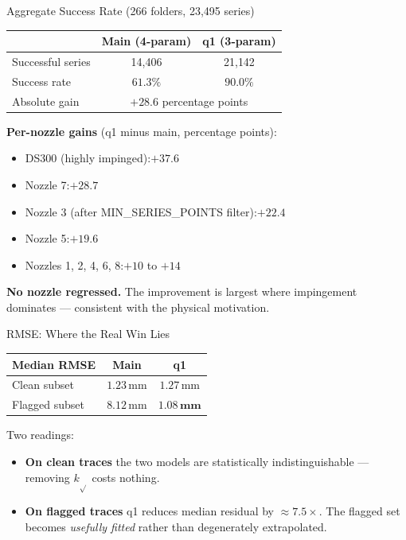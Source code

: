 \documentclass[UTF8,aspectratio=169]{ctexbeamer}
\begin{document}
\begin{frame}{Aggregate Success Rate (266 folders, 23{,}495 series)}
\begin{center}
\begin{tabular}{lcc}
\toprule
& Main (4-param) & q1 (3-param) \\
\midrule
Successful series           & 14{,}406  & 21{,}142 \\
Success rate                & $61.3\%$  & $\mathbf{90.0\%}$ \\
Absolute gain               & \multicolumn{2}{c}{$+28.6$ percentage points} \\
\bottomrule
\end{tabular}
\end{center}

\vspace{0.7em}
\textbf{Per-nozzle gains} (q1 minus main, percentage points):
\begin{itemize}
  \item DS300 (highly impinged):\quad $+37.6$
  \item Nozzle 7:\quad $+28.7$
  \item Nozzle 3 (after MIN\_SERIES\_POINTS filter):\quad $+22.4$
  \item Nozzle 5:\quad $+19.6$
  \item Nozzles 1, 2, 4, 6, 8:\quad $+10$ to $+14$
\end{itemize}
\textbf{No nozzle regressed.} The improvement is largest where impingement
dominates --- consistent with the physical motivation.
\end{frame}

\begin{frame}{RMSE: Where the Real Win Lies}
\begin{center}
\begin{tabular}{lcc}
\toprule
Median RMSE                  & Main          & q1 \\
\midrule
Clean subset                 & $1.23\,$mm    & $1.27\,$mm \\
Flagged subset               & $8.12\,$mm    & $\mathbf{1.08\,\text{mm}}$ \\
\bottomrule
\end{tabular}
\end{center}

\vspace{0.7em}
Two readings:
\begin{itemize}
  \item \textbf{On clean traces} the two models are statistically indistinguishable
        --- removing $k_{\sqrt{}}$ costs nothing.
  \item \textbf{On flagged traces} q1 reduces median residual by $\approx 7.5\times$.
        The flagged set becomes \emph{usefully fitted} rather than degenerately
        extrapolated.
\end{itemize}
\end{frame}
\end{document}
